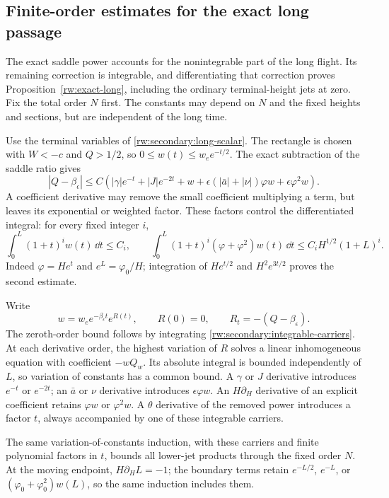 \subsection{Finite-order estimates for the exact long passage}
\label{rw:app:secondary-long}

The exact saddle power accounts for the nonintegrable part of the long
flight. Its remaining correction is integrable, and differentiating
that correction proves Proposition~\ref{rw:exact-long}, including the
ordinary terminal-height jets at zero. Fix the total order $N$ first.
The constants may depend on $N$ and the fixed heights and sections,
but are independent of the long time.

Use the terminal variables of \eqref{rw:secondary:long-scalar}.
The rectangle is chosen with $W<-c$ and $Q>1/2$, so
$0\le w(t)\le w_e e^{-t/2}$. The exact subtraction of the saddle
ratio gives
\begin{equation}\label{rw:secondary:integrable-carriers}
 |Q-\beta_\epsilon|\le C\left(
 |\gamma|e^{-t}+|J|e^{-2t}+w+
 \epsilon(|\bar a|+|\nu|)\varphi w+\epsilon\varphi^2w\right).
\end{equation}
A coefficient derivative may remove the small coefficient multiplying
a term, but leaves its exponential or weighted factor. These factors
control the differentiated integral: for every fixed integer $i$,
\[
 \int_0^L(1+t)^iw(t)\,\dd t\le C_i,\qquad
 \int_0^L(1+t)^i(\varphi+\varphi^2)w(t)\,\dd t
       \le C_iH^{1/2}(1+L)^i .
\]
Indeed $\varphi=He^t$ and $e^L=\varphi_0/H$; integration of
$He^{t/2}$ and $H^2e^{3t/2}$ proves the second estimate.

Write
\[
 w=w_e e^{-\beta_\epsilon t}e^{R(t)},\qquad R(0)=0,\qquad
 R_t=-(Q-\beta_\epsilon).
\]
The zeroth-order bound follows by integrating
\eqref{rw:secondary:integrable-carriers}.
At each derivative order, the highest variation of $R$ solves a linear
inhomogeneous equation with coefficient $-wQ_w$. Its absolute integral
is bounded independently of $L$, so variation of constants has a common
bound. A $\gamma$ or $J$ derivative introduces $e^{-t}$ or $e^{-2t}$;
an $\bar a$ or $\nu$ derivative introduces $\epsilon\varphi w$.
An $H\partial_H$ derivative of an explicit coefficient retains
$\varphi w$ or $\varphi^2w$. A $\theta$ derivative of the removed
power introduces a factor $t$, always accompanied by one of these
integrable carriers.

The same variation-of-constants induction, with these carriers and
finite polynomial factors in $t$, bounds all lower-jet products through
the fixed order $N$. At the moving endpoint, $H\partial_HL=-1$;
the boundary terms retain
$e^{-L/2}$, $e^{-L}$, or $(\varphi_0+\varphi_0^2)w(L)$, so the same
induction includes them.

